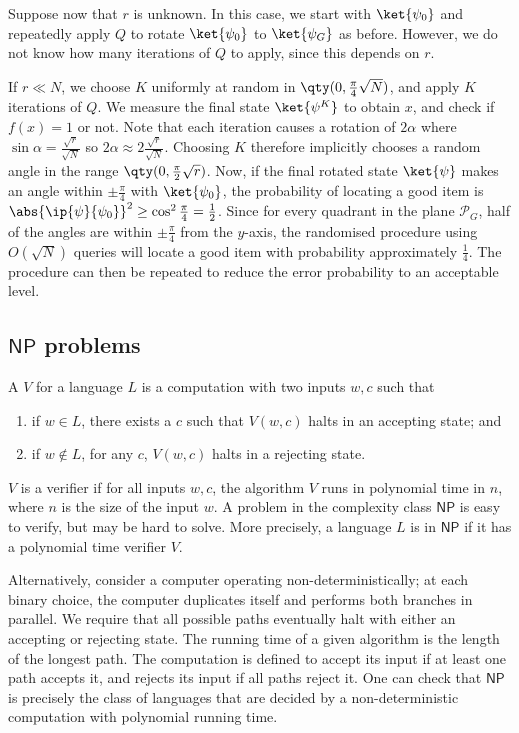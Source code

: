 Suppose now that $r$ is unknown.
In this case, we start with $\ket{\psi_0}$ and repeatedly apply $Q$ to rotate $\ket{\psi_0}$ to $\ket{\psi_G}$ as before.
However, we do not know how many iterations of $Q$ to apply, since this depends on $r$.

If $r \ll N$, we choose $K$ uniformly at random in $\qty(0, \frac{\pi}{4}\sqrt{N})$, and apply $K$ iterations of $Q$.
We measure the final state $\ket{\psi^K}$ to obtain $x$, and check if $f(x) = 1$ or not.
Note that each iteration causes a rotation of $2\alpha$ where $\sin \alpha = \frac{\sqrt{r}}{\sqrt{N}}$ so $2\alpha \approx 2\frac{\sqrt{r}}{\sqrt{N}}$.
Choosing $K$ therefore implicitly chooses a random angle in the range $\qty(0, \frac{\pi}{2} \sqrt{r})$.
Now, if the final rotated state $\ket{\psi}$ makes an angle within $\pm \frac{\pi}{4}$ with $\ket{\psi_0}$, the probability of locating a good item is $\abs{\ip{\psi}{\psi_0}}^2 \geq \cos^2 \frac{\pi}{4} = \frac{1}{2}$.
Since for every quadrant in the plane $\mathcal P_G$, half of the angles are within $\pm \frac{\pi}{4}$ from the $y$-axis, the randomised procedure using $O(\sqrt{N})$ queries will locate a good item with probability approximately $\frac{1}{4}$.
The procedure can then be repeated to reduce the error probability to an acceptable level.

\subsection{\texorpdfstring{$\mathsf{NP}$}{NP} problems}
A  $V$ for a language $L$ is a computation with two inputs $w, c$ such that
\begin{enumerate}
    \item if $w \in L$, there exists a  $c$ such that $V(w,c)$ halts in an accepting state; and
    \item if $w \not\in L$, for any $c$, $V(w,c)$ halts in a rejecting state.
\end{enumerate}
$V$ is a  verifier if for all inputs $w, c$, the algorithm $V$ runs in polynomial time in $n$, where $n$ is the size of the input $w$.
A problem in the  complexity class $\mathsf{NP}$ is easy to verify, but may be hard to solve.
More precisely, a language $L$ is in $\mathsf{NP}$ if it has a polynomial time verifier $V$.

Alternatively, consider a computer operating non-deterministically; at each binary choice, the computer duplicates itself and performs both branches in parallel.
We require that all possible paths eventually halt with either an accepting or rejecting state.
The running time of a given algorithm is the length of the longest path.
The computation is defined to accept its input if at least one path accepts it, and rejects its input if all paths reject it.
One can check that $\mathsf{NP}$ is precisely the class of languages that are decided by a non-deterministic computation with polynomial running time.


